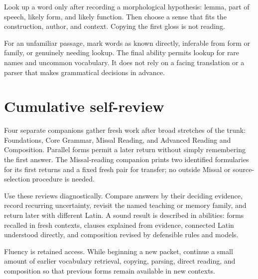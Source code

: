 Look up a word only after recording a morphological hypothesis: lemma, part of
speech, likely form, and likely function. Then choose a sense that fits the
construction, author, and context. Copying the first gloss is not reading.

For an unfamiliar passage, mark words as known directly, inferable from form
or family, or genuinely needing lookup. The final ability permits lookup for
rare names and uncommon vocabulary. It does not rely on a facing translation
or a parser that makes grammatical decisions in advance.

\chapter{Cumulative self-review}

Four separate companions gather fresh work after broad stretches of the
trunk: Foundations, Core Grammar, Missal Reading, and Advanced Reading and
Composition. Parallel forms permit a later return without simply remembering
the first answer. The Missal-reading companion prints two identified
formularies for its first returns and a fixed fresh pair for transfer; no
outside Missal or source-selection procedure is needed.

Use these reviews diagnostically. Compare answers by their deciding evidence,
record recurring uncertainty, revisit the named teaching or memory family,
and return later with different Latin. A sound result is described in
abilities: forms recalled in fresh contexts, clauses explained from evidence,
connected Latin understood directly, and composition revised by defensible
rules and models.

Fluency is retained access. While beginning a new packet, continue a small
amount of earlier vocabulary retrieval, copying, parsing, direct reading, and
composition so that previous forms remain available in new contexts.
